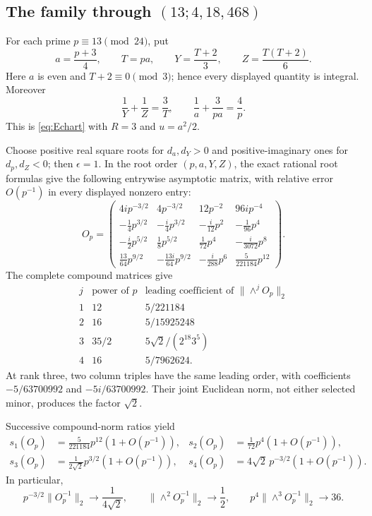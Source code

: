 \subsection{The family through \((13;4,18,468)\)}

For each prime \(p\equiv13\pmod {24}\), put
\begin{equation}\label{eq:family1}
 a=\frac{p+3}{4},\qquad T=pa,\qquad
 Y=\frac{T+2}{3},\qquad Z=\frac{T(T+2)}6.
\end{equation}
Here \(a\) is even and \(T+2\equiv0\pmod3\); hence every displayed quantity
is integral. Moreover
\[
 \frac1Y+\frac1Z=\frac3T,\qquad
 \frac1a+\frac3{pa}=\frac4p.
\]
This is \eqref{eq:Echart} with \(R=3\) and \(u=a^2/2\).

Choose positive real square roots for \(d_a,d_Y>0\) and positive-imaginary
ones for \(d_p,d_Z<0\); then \(\epsilon=1\). In the root order
\((p,a,Y,Z)\), the exact rational root formulas give the following entrywise
asymptotic matrix, with relative error \(O(p^{-1})\) in every displayed
nonzero entry:
\[
O_p=
\begin{pmatrix}
4ip^{-3/2}&4p^{-3/2}&12p^{-2}&96ip^{-4}\\
-\frac14p^{3/2}&-\frac i4p^{3/2}&-\frac i{12}p^2&-\frac1{96}p^4\\
-\frac i2p^{5/2}&\frac18p^{5/2}&\frac1{72}p^4&-\frac i{3072}p^8\\
\frac{13}{64}p^{9/2}&-\frac{13i}{64}p^{9/2}&-\frac i{288}p^6&
\frac5{221184}p^{12}
\end{pmatrix}.
\]
The complete compound matrices give
\begin{equation}\label{eq:family1-compounds}
\begin{array}{c|c|c}
j&\text{power of }p&\text{leading coefficient of }\|\wedge^jO_p\|_2\\ \hline
1&12&5/221184\\
2&16&5/15925248\\
3&35/2&5\sqrt2/(2^{18}3^5)\\
4&16&5/7962624.
\end{array}
\end{equation}
At rank three, two column triples have the same leading order, with
coefficients \(-5/63700992\) and \(-5i/63700992\). Their joint Euclidean norm,
not either selected minor, produces the factor \(\sqrt2\).

Successive compound-norm ratios yield
\begin{equation}\label{eq:family1-singular}
\begin{aligned}
s_1(O_p)&=\frac5{221184}p^{12}(1+O(p^{-1})),&
s_2(O_p)&=\frac1{72}p^4(1+O(p^{-1})),\\
s_3(O_p)&=\frac1{2\sqrt2}p^{3/2}(1+O(p^{-1})),&
s_4(O_p)&=4\sqrt2\,p^{-3/2}(1+O(p^{-1})).
\end{aligned}
\end{equation}
In particular,
\begin{equation}\label{eq:family1-inverse}
 p^{-3/2}\|O_p^{-1}\|_2\longrightarrow\frac1{4\sqrt2},
 \qquad
 \|\wedge^2O_p^{-1}\|_2\longrightarrow\frac12,
 \qquad
 p^4\|\wedge^3O_p^{-1}\|_2\longrightarrow36.
\end{equation}

